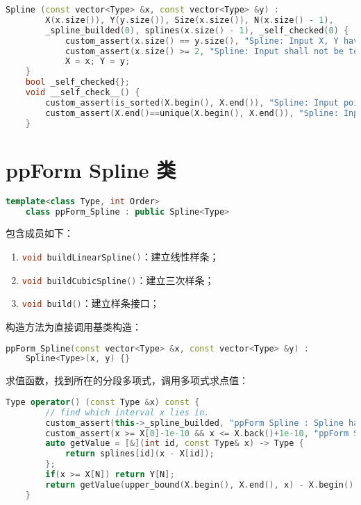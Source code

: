 \documentclass[lang=cn,a4paper,newtx,bibend=bibtex]{elegantpaper}
\newcommand{\LII}{\lstinline[language=C++]}
\begin{document}
\begin{lstlisting}[language = C++]
    Spline (const vector<Type> &x, const vector<Type> &y) : 
        X(x.size()), Y(y.size()), Size(x.size()), N(x.size() - 1), 
		_spline_builded(0), splines(x.size() - 1), _self_checked(0) {
			custom_assert(x.size() == y.size(), "Spline: Input X, Y have different length.");
			custom_assert(x.size() >= 2, "Spline: Input shall not be too short.");
        	X = x; Y = y;
    }
    bool _self_checked{};
    void __self_check__() {
        custom_assert(is_sorted(X.begin(), X.end()), "Spline: Input points not be sorted by X-coordinates.");
        custom_assert(X.end()==unique(X.begin(), X.end()), "Spline: Input points X-coordinates duplicate.");
    }
\end{lstlisting}

\section{ppForm Spline 类}

\begin{lstlisting}[language = C++]
    template<class Type, int Order>
    class ppForm_Spline : public Spline<Type> 
\end{lstlisting}

包含成员如下：
\begin{enumerate}
\item \LII{void buildLinearSpline()}：建立线性样条；
\item \LII{void buildCubicSpline()}：建立三次样条；
\item \LII{void build()}：建立样条接口；
\end{enumerate}

构造方法为直接调用基类构造：

\begin{lstlisting}[language = C++]
    ppForm_Spline(const vector<Type> &x, const vector<Type> &y) : 
    Spline<Type>(x, y) {}
\end{lstlisting}

求值函数，找到所在的分段多项式，调用多项式求点值：

\begin{lstlisting}[language = C++]
    Type operator() (const Type &x) const {
        // find which interval x lies in.
        custom_assert(this->_spline_builded, "ppForm Spline : Spline have not been built yet.");
        custom_assert(x >= X[0]-1e-10 && x <= X.back()+1e-10, "ppForm Spline : Input x is out of range.");
        auto getValue = [&](int id, const Type& x) -> Type {
            return splines[id](x - X[id]);
        };
		if(x >= X[N]) return Y[N];
        return getValue(upper_bound(X.begin(), X.end(), x) - X.begin() - 1, x);
    }
\end{lstlisting}
\end{document}
